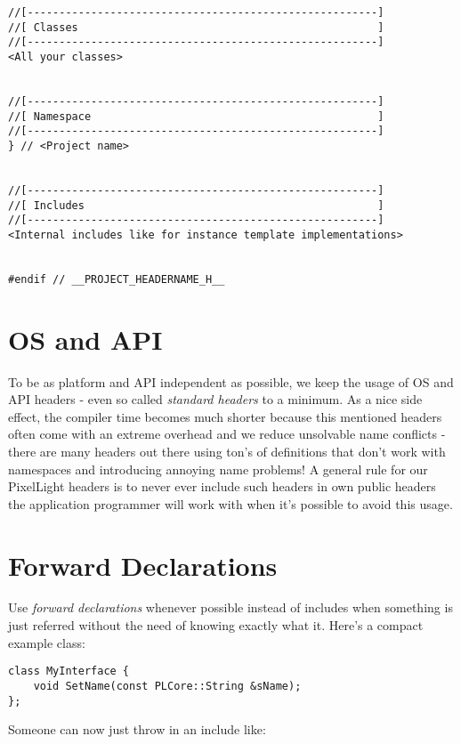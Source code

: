 \begin{lstlisting}[caption=Complete header layout]
//[-------------------------------------------------------]
//[ Classes                                               ]
//[-------------------------------------------------------]
<All your classes>


//[-------------------------------------------------------]
//[ Namespace                                             ]
//[-------------------------------------------------------]
} // <Project name>


//[-------------------------------------------------------]
//[ Includes                                              ]
//[-------------------------------------------------------]
<Internal includes like for instance template implementations>


#endif // __PROJECT_HEADERNAME_H__
\end{lstlisting}




\section{OS and API}
To be as platform and API independent as possible, we keep the usage of OS and API headers - even so called \emph{standard headers} to a minimum. As a nice side effect, the compiler time becomes much shorter because this mentioned headers often come with an extreme overhead and we reduce unsolvable name conflicts - there are many headers out there using ton's of definitions that don't work with namespaces and introducing annoying name problems! A general rule for our PixelLight headers is to never ever include such headers in own public headers the application programmer will work with when it's possible to avoid this usage.




\section{Forward Declarations}
Use \emph{forward declarations} whenever possible instead of includes when something is just referred without the need of knowing exactly what it. Here's a compact example class:

\begin{lstlisting}[caption=Using forward declaration]
class MyInterface {
    void SetName(const PLCore::String &sName);
};
\end{lstlisting}

Someone can now just throw in an include like:


